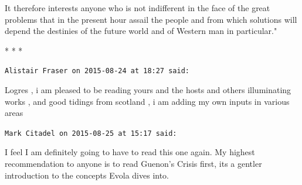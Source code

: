 It therefore interests anyone who is not indifferent in the face of the great problems that in the present hour assail the people and from which solutions will depend the destinies of the future world and of Western man in particular."


\begin{center}* * *\end{center}

\begin{footnotesize}\begin{sffamily}



\texttt{Alistair Fraser on 2015-08-24 at 18:27 said: }

Logres , i am pleased to be reading yours and the hosts and others illuminating works , and good tidings from scotland , i am adding my own inputs in various areas


\hfill

\texttt{Mark Citadel on 2015-08-25 at 15:17 said: }

I feel I am definitely going to have to read this one again. My highest recommendation to anyone is to read Guenon's Crisis first, its a gentler introduction to the concepts Evola dives into.


\end{sffamily}\end{footnotesize}
